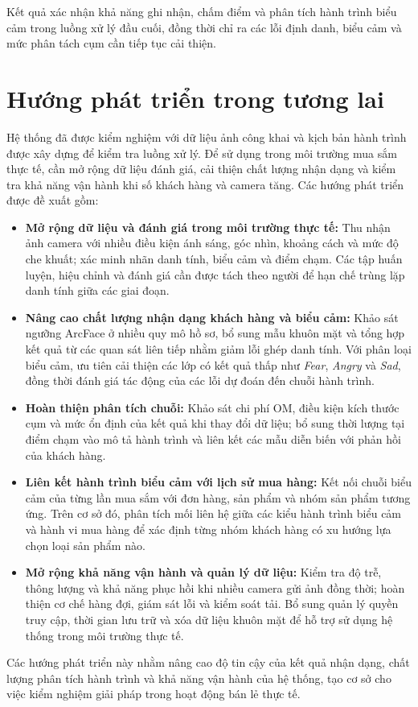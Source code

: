 \documentclass[../LuanVan.tex]{subfiles}
\begin{document}
Kết quả xác nhận khả năng ghi nhận, chấm điểm và phân tích hành trình biểu cảm trong luồng xử lý đầu cuối, đồng thời chỉ ra các lỗi định danh, biểu cảm và mức phân tách cụm cần tiếp tục cải thiện.

\clearpage
\section{Hướng phát triển trong tương lai}
\label{section:6.2}

Hệ thống đã được kiểm nghiệm với dữ liệu ảnh công khai và kịch bản hành trình được xây dựng để kiểm tra luồng xử lý. Để sử dụng trong môi trường mua sắm thực tế, cần mở rộng dữ liệu đánh giá, cải thiện chất lượng nhận dạng và kiểm tra khả năng vận hành khi số khách hàng và camera tăng. Các hướng phát triển được đề xuất gồm:

\begin{itemize}
    \item \textbf{Mở rộng dữ liệu và đánh giá trong môi trường thực tế:} Thu nhận ảnh camera với nhiều điều kiện ánh sáng, góc nhìn, khoảng cách và mức độ che khuất; xác minh nhãn danh tính, biểu cảm và điểm chạm. Các tập huấn luyện, hiệu chỉnh và đánh giá cần được tách theo người để hạn chế trùng lặp danh tính giữa các giai đoạn.

    \item \textbf{Nâng cao chất lượng nhận dạng khách hàng và biểu cảm:} Khảo sát ngưỡng ArcFace ở nhiều quy mô hồ sơ, bổ sung mẫu khuôn mặt và tổng hợp kết quả từ các quan sát liên tiếp nhằm giảm lỗi ghép danh tính. Với phân loại biểu cảm, ưu tiên cải thiện các lớp có kết quả thấp như \textit{Fear}, \textit{Angry} và \textit{Sad}, đồng thời đánh giá tác động của các lỗi dự đoán đến chuỗi hành trình.

    \item \textbf{Hoàn thiện phân tích chuỗi:} Khảo sát chi phí OM, điều kiện kích thước cụm và mức ổn định của kết quả khi thay đổi dữ liệu; bổ sung thời lượng tại điểm chạm vào mô tả hành trình và liên kết các mẫu diễn biến với phản hồi của khách hàng.

    \item \textbf{Liên kết hành trình biểu cảm với lịch sử mua hàng:} Kết nối chuỗi biểu cảm của từng lần mua sắm với đơn hàng, sản phẩm và nhóm sản phẩm tương ứng. Trên cơ sở đó, phân tích mối liên hệ giữa các kiểu hành trình biểu cảm và hành vi mua hàng để xác định từng nhóm khách hàng có xu hướng lựa chọn loại sản phẩm nào.

    \item \textbf{Mở rộng khả năng vận hành và quản lý dữ liệu:} Kiểm tra độ trễ, thông lượng và khả năng phục hồi khi nhiều camera gửi ảnh đồng thời; hoàn thiện cơ chế hàng đợi, giám sát lỗi và kiểm soát tải. Bổ sung quản lý quyền truy cập, thời gian lưu trữ và xóa dữ liệu khuôn mặt để hỗ trợ sử dụng hệ thống trong môi trường thực tế.
\end{itemize}

Các hướng phát triển này nhằm nâng cao độ tin cậy của kết quả nhận dạng, chất lượng phân tích hành trình và khả năng vận hành của hệ thống, tạo cơ sở cho việc kiểm nghiệm giải pháp trong hoạt động bán lẻ thực tế.
\end{document}
